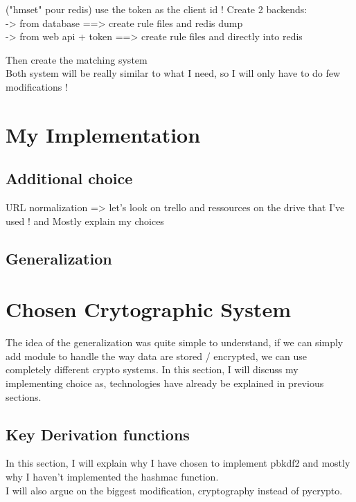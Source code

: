 \documentclass{eplmastersthesis}
\begin{document}
\info("hmset" pour redis)
use the token as the client id !
Create 2 backends:\\
-> from  database ==> create rule files and redis dump \\
-> from web api + token ==> create rule files and directly into redis \\



Then create the matching system\\

Both system will be really similar to what I need, so I will only have to do few modifications !
\section{My Implementation}

\subsection{\cite{van2016private}}

\subsection{Additional choice}
URL normalization => let's look on trello and ressources on the drive that I've used ! and Mostly explain my choices 

\subsection{Generalization}

\section{Chosen Crytographic System}
The idea of the generalization was quite simple to understand, if we can simply add module to handle the way data are stored / encrypted, we can use completely different crypto systems. In this section, I will discuss my implementing choice as, technologies have already be explained in previous sections.

\subsection{Key Derivation functions}
In this section, I will explain why I have chosen to implement pbkdf2 and mostly why I haven't implemented the hashmac function.\\
I will also argue on the biggest modification, cryptography instead of pycrypto.
\end{document}
